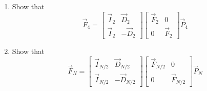 \documentclass[journal,12pt,twocolumn]{IEEEtran}
\renewcommand\thesection{\arabic{section}}
\begin{document}
\begin{enumerate}[label=\arabic*.,ref=\thesection.\theenumi]
    \item Show that 
\begin{equation}
	\vec{F}_{4}=
\begin{bmatrix}
	\vec{I}_{2} & \vec{D}_{2} \\
\vec{I}_{2} & -\vec{D}_{2}
\end{bmatrix}
\begin{bmatrix}
\vec{F}_{2} & 0 \\
0 & \vec{F}_{2}
\end{bmatrix}
\vec{P}_{4}
\end{equation}
\item Show that 
\begin{equation}
\vec{F}_{N}=
\begin{bmatrix}
\vec{I}_{N/2} & \vec{D}_{N/2} \\
\vec{I}_{N/2} & -\vec{D}_{N/2}
\end{bmatrix}
\begin{bmatrix}
\vec{F}_{N/2} & 0 \\
0 & \vec{F}_{N/2}
\end{bmatrix}
\vec{P}_{N}
\end{equation}


\end{enumerate}
\end{document}
